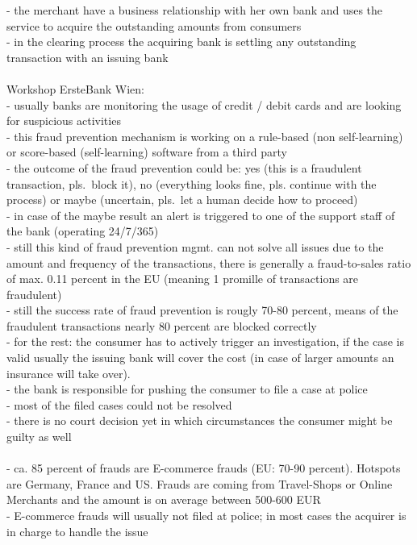 - the merchant have a business relationship with her own bank and uses the service to acquire the outstanding amounts from consumers \\
- in the clearing process the acquiring bank is settling any outstanding transaction with an issuing bank \\
\\
Workshop ErsteBank Wien: \\
- usually banks are monitoring the usage of credit / debit cards and are looking for suspicious activities \\
- this fraud prevention mechanism is working on a rule-based (non self-learning) or score-based (self-learning) software from a third party \\
- the outcome of the fraud prevention could be: yes (this is a fraudulent transaction, pls.\ block it), no (everything looks fine, pls. continue with the process) or maybe (uncertain, pls.\ let a human decide how to proceed) \\
- in case of the maybe result an alert is triggered to one of the support staff of the bank (operating 24/7/365) \\
- still this kind of fraud prevention mgmt. can not solve all issues due to the amount and frequency of the transactions, there is generally a
fraud-to-sales ratio of max. 0.11 percent in the EU (meaning 1 promille of transactions are fraudulent) \\
- still the success rate of fraud prevention is rougly 70-80 percent, means of the fraudulent transactions nearly 80 percent are blocked correctly \\
- for the rest: the consumer has to actively trigger an investigation, if the case is valid usually the issuing bank will cover the cost (in case of larger amounts an insurance will take over). \\
- the bank is responsible for pushing the consumer to file a case at police \\
- most of the filed cases could not be resolved \\
- there is no court decision yet in which circumstances the consumer might be guilty as well \\
\\
- ca. 85 percent of frauds are E-commerce frauds (EU: 70-90 percent). Hotspots are Germany, France and US. Frauds are coming from Travel-Shops or Online Merchants and the amount is on average between 500-600 EUR \\
- E-commerce frauds will usually not filed at police; in most cases the acquirer is in charge to handle the issue \\
